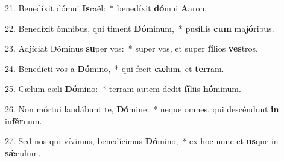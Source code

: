 21. Benedíxit dómui \textbf{Is}raël:~*  benedíxit \textbf{dó}mui \textbf{A}aron.\

22. Benedíxit ómnibus, qui timent \textbf{Dó}minum,~*  pusíllis \textbf{cum} ma\textbf{jó}ribus.\

23. Adjíciat Dóminus \textbf{su}per vos:~*  super vos, et super \textbf{fí}lios \textbf{ves}tros.\

24. Benedícti vos a \textbf{Dó}mino,~*  qui fecit \textbf{cæ}lum, et \textbf{ter}ram.\

25. Cælum cæli \textbf{Dó}mino:~*  terram autem dedit \textbf{fí}liis \textbf{hó}minum.\

26. Non mórtui laudábunt te, \textbf{Dó}mine:~*  neque omnes, qui descéndunt \textbf{in} in\textbf{fér}num.\

27. Sed nos qui vívimus, benedícimus \textbf{Dó}mino,~*  ex hoc nunc et \textbf{us}que in \textbf{sǽ}culum.\

